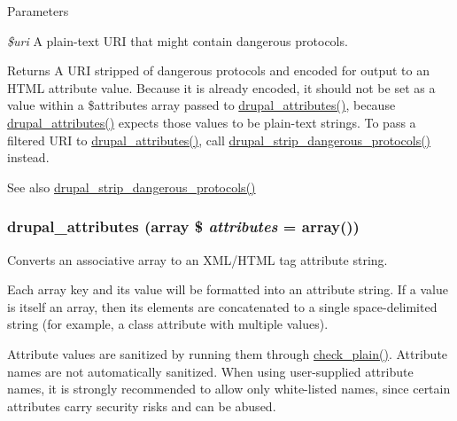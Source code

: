 \begin{DoxyParams}{Parameters}
\item[{\em \$uri}]A plain-\/text URI that might contain dangerous protocols.\end{DoxyParams}
\begin{DoxyReturn}{Returns}
A URI stripped of dangerous protocols and encoded for output to an HTML attribute value. Because it is already encoded, it should not be set as a value within a \$attributes array passed to \hyperlink{group__sanitization_gacf11629fb3d1ebf200863e2d15380b4a}{drupal\_\-attributes()}, because \hyperlink{group__sanitization_gacf11629fb3d1ebf200863e2d15380b4a}{drupal\_\-attributes()} expects those values to be plain-\/text strings. To pass a filtered URI to \hyperlink{group__sanitization_gacf11629fb3d1ebf200863e2d15380b4a}{drupal\_\-attributes()}, call \hyperlink{group__sanitization_ga46ff2822d576a77317f9045d65317b4f}{drupal\_\-strip\_\-dangerous\_\-protocols()} instead.
\end{DoxyReturn}
\begin{DoxySeeAlso}{See also}
\hyperlink{group__sanitization_ga46ff2822d576a77317f9045d65317b4f}{drupal\_\-strip\_\-dangerous\_\-protocols()} 
\end{DoxySeeAlso}
\hypertarget{group__sanitization_gacf11629fb3d1ebf200863e2d15380b4a}{
\subsubsection[{drupal\_\-attributes}]{\setlength{\rightskip}{0pt plus 5cm}drupal\_\-attributes (array \$ {\em attributes} = {\ttfamily array()})}}
\label{group__sanitization_gacf11629fb3d1ebf200863e2d15380b4a}
Converts an associative array to an XML/HTML tag attribute string.

Each array key and its value will be formatted into an attribute string. If a value is itself an array, then its elements are concatenated to a single space-\/delimited string (for example, a class attribute with multiple values).

Attribute values are sanitized by running them through \hyperlink{group__sanitization_ga76fc67a30fd8d75ddd80565e6e65a13d}{check\_\-plain()}. Attribute names are not automatically sanitized. When using user-\/supplied attribute names, it is strongly recommended to allow only white-\/listed names, since certain attributes carry security risks and can be abused.

